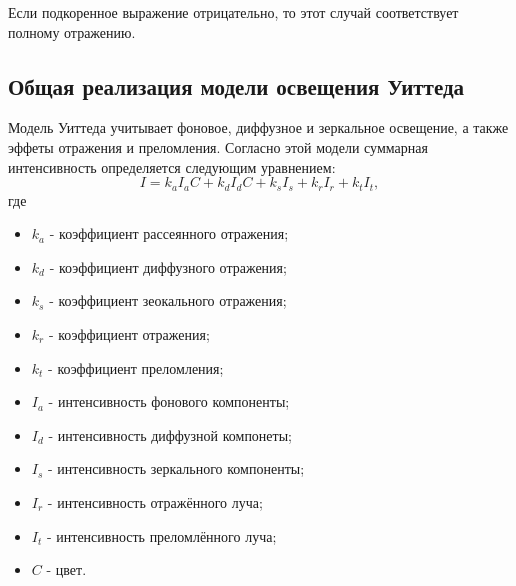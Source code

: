 \documentclass[12pt,a4paper,oneside]{report}
\begin{document}
				\quad Если подкоренное выражение отрицательно, то этот случай соответствует полному отражению.	
			\subsection{Общая реализация модели освещения Уиттеда}
				\quad Модель Уиттеда учитывает фоновое, диффузное и зеркальное освещение, а также эффеты отражения и преломления. Согласно этой модели суммарная интенсивность определяется следующим уравнением:
				\[
    				I = k_{a}I_{a}C + k_{d}I_{d}C + k_{s}I_{s} + k_{r}I_{r} + k_{t}I_{t},
				\]
				\quad где 
				\begin{itemize}
    				\item $k_{a}$ - коэффициент рассеянного отражения;
    				\item $k_{d}$ - коэффициент диффузного отражения;
    				\item $k_{s}$ - коэффициент зеокального отражения;
    				\item $k_{r}$ - коэффициент отражения;
    				\item $k_{t}$ - коэффициент преломления;
    				\item $I_{a}$ - интенсивность фонового компоненты;
    				\item $I_{d}$ - интенсивность диффузной компонеты;
    				\item $I_{s}$ - интенсивность зеркального компоненты;
    				\item $I_{r}$ - интенсивность отражённого луча;
    				\item $I_{t}$ - интенсивность преломлённого луча;
    				\item $C$ - цвет.
    			\end{itemize}
\end{document}
